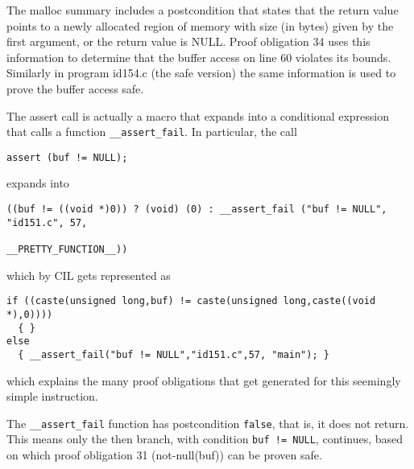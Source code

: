 \documentclass[11pt]{article}
\begin{document}
The malloc summary includes a postcondition that states that the return value 
points to a newly allocated region of memory with size (in bytes) given by the 
first argument, or the return value is NULL. Proof obligation 34 uses this 
information to determine that the buffer access on line 60 violates its bounds. 
Similarly in program id154.c (the safe version) the same information is used 
to prove the buffer access safe.

The assert call is actually a macro that expands into a conditional expression 
that calls a function {\tt \_\_assert\_fail}. In particular, the call
\begin{verbatim}
assert (buf != NULL);
\end{verbatim}
expands into
\begin{small}
\begin{verbatim}
((buf != ((void *)0)) ? (void) (0) : __assert_fail ("buf != NULL", "id151.c", 57,
                                                    __PRETTY_FUNCTION__))
\end{verbatim}
\end{small}
which by CIL gets represented as
\begin{small}
\begin{verbatim}
if ((caste(unsigned long,buf) != caste(unsigned long,caste((void *),0))))
  { }
else
  { __assert_fail("buf != NULL","id151.c",57, "main"); }
\end{verbatim}
\end{small}
which explains the many proof obligations that get generated for this seemingly 
simple instruction.

The {\tt \_\_assert\_fail} function has postcondition {\tt false}, that is, it does not 
return. This means only the then branch, with condition {\tt buf != NULL}, continues, 
based on which proof obligation 31 (not-null(buf)) can be proven safe.
\end{document}
